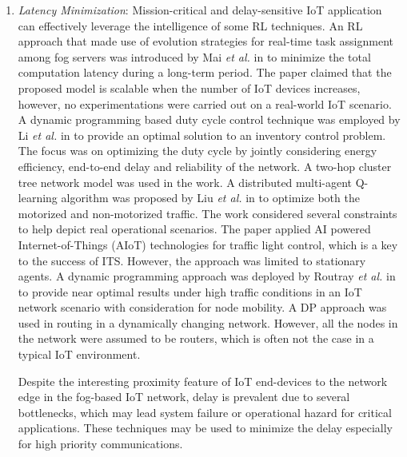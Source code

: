 \documentclass[journal]{IEEEtran}
\begin{document}
\begin{enumerate}[leftmargin=*,label= \arabic*)]
       \item \textit{Latency Minimization}: Mission-critical and delay-sensitive IoT application can effectively leverage the intelligence of some RL techniques. An RL approach that made use of evolution strategies for real-time task assignment among fog servers was introduced by Mai \emph{et al.} in \cite{Mai2018} to minimize the total computation latency during a long-term period. The paper claimed that the proposed model is scalable when the number of IoT devices increases, however, no experimentations were carried out on a real-world IoT scenario. A dynamic programming based duty cycle control technique was employed by Li \emph{et al.} in \cite{Li2014} to provide an optimal solution to an inventory control problem. The focus was on optimizing the duty cycle by jointly considering energy efficiency, end-to-end delay and reliability of the network. A two-hop cluster tree network model was used in the work. A distributed multi-agent Q-learning algorithm was proposed by Liu \emph{et al.} in \cite{Liu2017} to optimize both the motorized and non-motorized traffic. The work considered several constraints to help depict real operational scenarios. The paper applied AI powered Internet-of-Things (AIoT) technologies for traffic light control, which is a key to the success of ITS. However, the approach was limited to stationary agents. A dynamic programming approach was deployed by Routray \emph{et al.} in \cite{routray2017} to provide near optimal results under high traffic conditions in an IoT network scenario with consideration for node mobility. A DP approach was used in routing in a dynamically changing network. However, all the nodes in the network were assumed to be routers, which is often not the case in a typical IoT environment.

           Despite the interesting proximity feature of IoT end-devices to the network edge in the fog-based IoT network, delay is prevalent due to several bottlenecks, which may lead system failure or operational hazard for critical applications. These techniques may be used to minimize the delay especially for high priority communications.


\end{enumerate}
\end{document}
